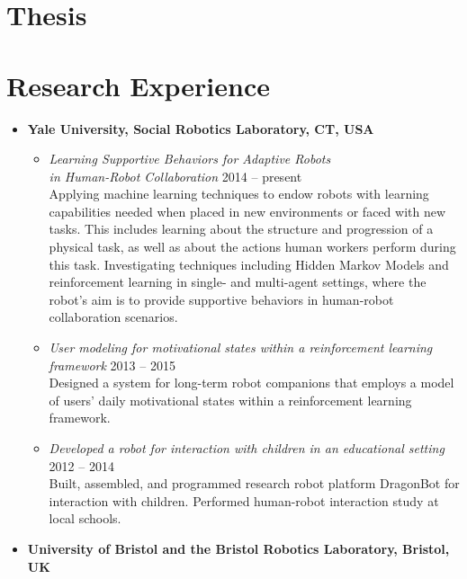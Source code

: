 \documentclass[10pt,letterpaper]{article}
\newcommand{\thing}[2]{{#1} \hfill {#2}}
\begin{document}
\section{Thesis}
\printbibliography[heading=none,keyword=thesis,omitnumbers=true,prefixnumbers={Master's Thesis}]

\section{Research Experience}
\begin{itemize}%
\item {\bf Yale University, Social Robotics Laboratory, CT, USA}\\
	\begin{itemize}\setlength\itemsep{0.8em}\vspace{-1em}
	\item \thing{\it Learning Supportive Behaviors for Adaptive Robots \\ in Human-Robot Collaboration}{2014 -- present}\vspace{0.1em}\\
	Applying machine learning techniques to endow robots with learning capabilities needed when placed in new environments or faced with new tasks. This includes learning about the structure and progression of a physical task, as well as about the actions human workers perform during this task. Investigating techniques including Hidden Markov Models and reinforcement learning in single- and multi-agent settings, where the robot's aim is to provide supportive behaviors in human-robot collaboration scenarios.
	\item \thing{\it User modeling for motivational states within a reinforcement learning framework}{2013 -- 2015}\vspace{0.1em}\\
	Designed a system for long-term robot companions that employs a model of users' daily motivational states within a reinforcement learning framework.
	\item \thing{\it Developed a robot for interaction with children in an educational setting}{2012 -- 2014}\vspace{0.1em}\\
	 Built, assembled, and programmed research robot platform DragonBot for interaction with children. Performed human-robot interaction study at local schools.
	\end{itemize}
\item {\bf University of Bristol and the Bristol Robotics Laboratory, Bristol, UK}\\

\end{itemize}
\end{document}
